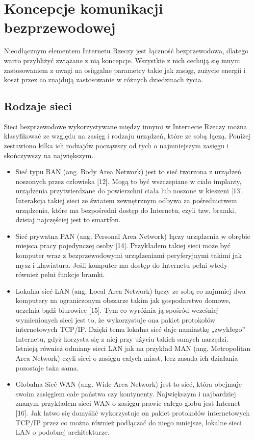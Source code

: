 \documentclass[12pt, twoside, openany]{mwrep}
\begin{document}
\section{Koncepcje komunikacji bezprzewodowej}

Nieodłącznym elementem Internetu Rzeczy jest łączność bezprzewodowa, dlatego warto przybliżyć związane z nią koncepcje. Wszystkie z nich cechują się innym zastosowaniem z uwagi na osiągalne parametry takie jak zasięg, zużycie energii i koszt przez co znajdują zastosowanie w różnych dziedzinach życia.

\subsection{Rodzaje sieci}

Sieci bezprzewodowe wykorzystywane między innymi w Internecie Rzeczy można klasyfikować ze względu na zasięg i rodzaju urządzeń, które ze sobą łączą. Poniżej zestawiono kilka ich rodzajów począwszy od tych o najmniejszym zasięgu i skończywszy na największym.
\begin{itemize}
    \item Sieć typu BAN (ang. Body Area Network) jest to sieć tworzona z urządzeń noszonych przez człowieka [12]. Mogą to być wszczepiane w ciało implanty, urządzenia przytwierdzane do powierzchni ciała lub noszone w kieszeni [13]. Interakcja takiej sieci ze światem zewnętrznym odbywa za pośrednictwem urządzenia, które ma bezpośredni dostęp do Internetu, czyli tzw. bramki, dzisiaj najczęściej jest to smartfon.
    \item Sieć prywatna PAN (ang. Personal Area Network) łączy urządzenia w obrębie miejsca pracy pojedynczej osoby [14]. Przykładem takiej sieci może być komputer wraz z bezprzewodowymi urządzeniami peryferyjnymi takimi jak mysz i klawiatura. Jeśli komputer ma dostęp do Internetu pełni wtedy również pełni funkcje bramki.
    \item Lokalna sieć LAN (ang. Local Area Network) łączy ze sobą co najmniej dwa komputery na ograniczonym obszarze takim jak gospodarstwo domowe, uczelnia bądź biurowiec [15]. Tym co wyróżnia ją spośród wcześniej wymienionych sieci jest to, że wykorzystuje ona pakiet protokołów internetowych TCP/IP. Dzięki temu lokalna sieć daje namiastkę „zwykłego” Internetu, gdyż korzysta się z niej przy użyciu takich samych narzędzi. Istnieją również odmiany sieci LAN jak na przykład MAN (ang. Metropolitan Area Network) czyli sieci o zasięgu całych miast, lecz zasada ich działania pozostaje taka sama.
    \item Globalna Sieć WAN (ang. Wide Area Network) jest to sieć, która obejmuje swoim zasięgiem całe państwa czy kontynenty. Największym i najbardziej znanym przykładem sieci WAN o zasięgu prawie całego globu jest Internet [16]. Jak łatwo się domyślić wykorzystuje on pakiet protokołów internetowych TCP/IP przez co można również podłączać do niego mniejsze, lokalne sieci LAN o podobnej architekturze.
\end{itemize}   
\end{document}
